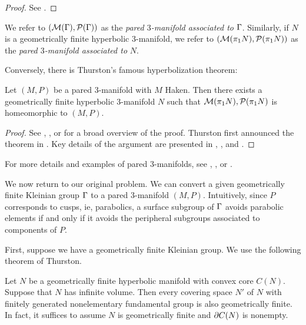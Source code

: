 \begin{proof}

See \cite[Corollary 6.10]{Mo}. %

\end{proof}

We refer to $(\mathcal{M}(\Gamma),\mathcal{P}(\Gamma))$ as the \emph{pared $3$-manifold associated
to} $\Gamma$.  Similarly, if $N$ is a geometrically finite hyperbolic
$3$-manifold, we refer to $(\mathcal{M}(\pi_1N),\mathcal{P}(\pi_1N))$ as the \emph{pared
$3$-manifold associated to} $N$.

Conversely, there is Thurston's famous hyperbolization theorem:

\begin{thm}

Let $(M,P)$ be a pared $3$-manifold with $M$ Haken. Then there exists
a geometrically finite hyperbolic $3$-manifold $N$ such that
$\mathcal{M}(\pi_1N),\mathcal{P}(\pi_1N)$ is homeomorphic to $(M,P)$.

\end{thm}

\begin{proof}

See \cite{Mo}, \cite{ThurstonviaScott}, or \cite{Kapovich} for a broad overview
of the proof. Thurston first announced the theorem in \cite{Thurston0}. Key
details of the argument are presented in \cite{ThurstonI}, \cite{ThurstonII},
and \cite{ThurstonIII}.

\end{proof}

For more details and examples of pared $3$-manifolds, see \cite{CMc},
\cite{Mo}, or \cite{ThurstonI}.

We now return to our original problem. We can convert a given geometrically
finite Kleinian group $\Gamma$ to a pared $3$-manifold $(M,P)$. Intuitively, since
$P$ corresponds to cusps, ie, parabolics, a surface subgroup of $\Gamma$ avoids
parabolic elements if and only if it avoids the peripheral subgroups associated
to components of $P$.

First, suppose we have a geometrically finite Kleinian group.  We use the
following theorem of Thurston.

\begin{thm}

Let $N$ be a geometrically finite hyperbolic manifold with convex core $C(N)$.
Suppose that $N$ has infinite volume. Then every covering space $N'$ of $N$
with finitely generated nonelementary fundamental group is also geometrically
finite. In fact, it suffices to assume $N$ is geometrically finite and $\partial
C(N)$ is nonempty.


\end{thm}

